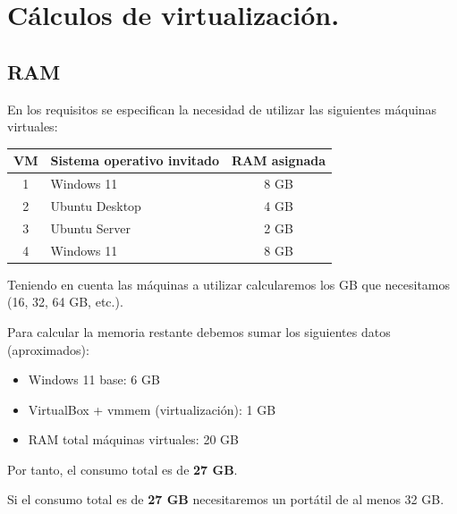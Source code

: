 \documentclass[11.5pt]{article}
\begin{document}
	\section{Cálculos de virtualización.}
	\subsection{RAM}
	En los requisitos se especifican la necesidad de utilizar las siguientes máquinas virtuales:
	
	\begin{tabular}{|c|l|c|}
		\hline
		\textbf{VM} & \textbf{Sistema operativo invitado} & \textbf{RAM asignada} \\
		\hline
		1 & Windows 11 & 8 GB \\
		\hline
		2 & Ubuntu Desktop & 4 GB \\
		\hline
		3 & Ubuntu Server & 2 GB \\
		\hline
		4 & Windows 11 & 8 GB \\
		\hline
	\end{tabular}
	
	Teniendo en cuenta las máquinas a utilizar calcularemos los GB que necesitamos (16, 32, 64 GB, etc.).
	
	Para calcular la memoria restante debemos sumar los siguientes datos (aproximados):
	
	\begin{itemize}
		\item Windows 11 base: 6 GB
		\item VirtualBox + vmmem (virtualización): 1 GB
		\item RAM total máquinas virtuales: 20 GB
	\end{itemize}
	
	Por tanto, el consumo total es de \textbf{27 GB}.
	
	Si el consumo total es de \textbf{27 GB} necesitaremos un portátil de al menos 32 GB.
	
\end{document}

